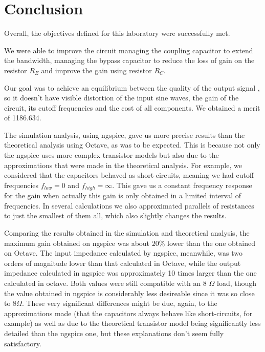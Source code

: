 \section{Conclusion}
\label{sec:conclusion}


Overall, the objectives defined for this laboratory were successfully met.

We were able to improve the circuit managing the coupling capacitor to extend the bandwidth, managing the bypass capacitor to reduce the loss of gain on the resistor $R_E$ and improve the gain using resistor $R_C$.

Our goal was to achieve an equilibrium between the quality of the output signal , so it doesn't have visible distortion of the input sine waves, the gain of the circuit, its cutoff frequencies and the cost of all components. We obtained a merit of 1186.634.

The simulation analysis, using ngspice, gave us more precise results than the theoretical analysis using Octave, as was to be expected. This is because not only the ngspice uses more complex transistor models but also due to the approximations that were made in the theoretical analysis. For example, we considered that the capacitors behaved as short-circuits, meaning we had cutoff frequencies $f_{low}=0$ and $f_{high}= \infty$. This gave us a constant frequency response for the gain when actually this gain is only obtained in a limited interval of frequencies.  In several calculations we also approximated parallels of resistances to just the smallest of them all, which also slightly changes the results.

Comparing the results obtained in the simulation and theoretical analysis, the maximum gain obtained on ngspice was about $20\%$ lower than the one obtained on Octave. The input impedance calculated by ngspice, meanwhile, was two orders of magnitude lower than that calculated in Octave, while the output impedance calculated in ngspice was approximately 10 times larger than the one calculated in octave. Both values were still compatible with an 8 $\Omega$ load, though the value obtained in ngspice is considerably less desireable since it was so close to $8 \Omega$. These very significant differences might be due, again, to the approximations made (that the capacitors always behave like short-circuits, for example) as well as due to the theoretical transistor model being significantly less detailed than the ngspice one, but these explanations don't seem fully satisfactory.


